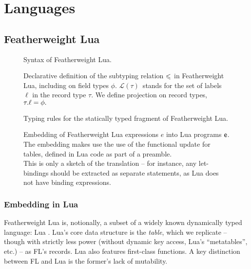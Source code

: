 
\section{Languages}
\label{sec:languages}


\subsection{Featherweight Lua}
\label{subsec:featherweight-lua}

\newcommand{\erased}[1]{\textcolor{red}{#1}}

\begin{figure}
    \centering
    
    \caption{Syntax of Featherweight Lua.}
    \label{fig:featherweight-lua-grammar}
\end{figure}

\begin{figure}
    \centering
    
    \caption{Declarative definition of the subtyping relation $\leqslant$ in Featherweight Lua, including on field types $\phi$. $\mathcal L(\tau)$~stands for the set of labels $\ell$ in the record type $\tau$. We define projection on record types,~${\tau}{.}{\ell} = \phi.$}
    \label{fig:featherweight-lua-subtyping}
\end{figure}

\begin{figure}
    
    \caption{Typing rules for the statically typed fragment of Featherweight Lua.}
    \label{fig:featherweight-lua-typing}
\end{figure}

\begin{figure}
    \centering
    
    \caption{Embedding of Featherweight Lua expressions $e$ into Lua programs $\textsf{e}$. The embedding makes use the use of the functional \textsf{update} for tables, defined in Lua code as part of a preamble. \\
    This is only a sketch of the translation -- for instance, any let-bindings should be extracted as separate statements, as Lua does not have binding expressions.}
    \label{fig:featherweight-lua-embedding}
\end{figure}


\subsubsection{Embedding in Lua}
Featherweight Lua is, notionally, a subset of a widely known dynamically typed language: Lua \cite{lua54}.
Lua's core data structure is the \emph{table}, which we replicate -- though with strictly less power (without dynamic key access, Lua's ``metatables'', etc.) -- as FL's records. 
Lua also features first-class functions.
A key distinction between FL and Lua is the former's lack of mutability. 

